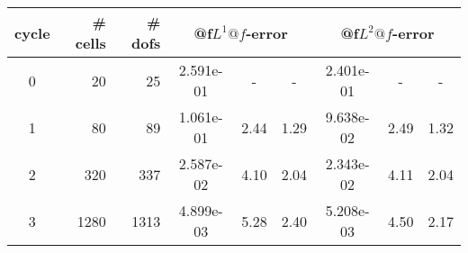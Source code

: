 \documentclass[10pt]{report}
\begin{document}
\begin{table}[H]
\begin{center}
\begin{tabular}{|c|r|r|c|c|c|c|c|c|} \hline
cycle & \# cells & \# dofs & 
\multicolumn{3}{|c|}{@f$L^1@f$-error} & 
\multicolumn{3}{|c|}{@f$L^2@f$-error}\\ \hline
0 & 20 & 25 & 2.591e-01 & - & - & 2.401e-01 & - & -\\ \hline
1 & 80 & 89 & 1.061e-01 & 2.44 & 1.29 & 9.638e-02 & 2.49 & 1.32\\ \hline
2 & 320 & 337 & 2.587e-02 & 4.10 & 2.04 & 2.343e-02 & 4.11 & 2.04\\ \hline
3 & 1280 & 1313 & 4.899e-03 & 5.28 & 2.40 & 5.208e-03 & 4.50 & 2.17\\ \hline
\end{tabular}
\end{center}
\end{table}
\end{document}
